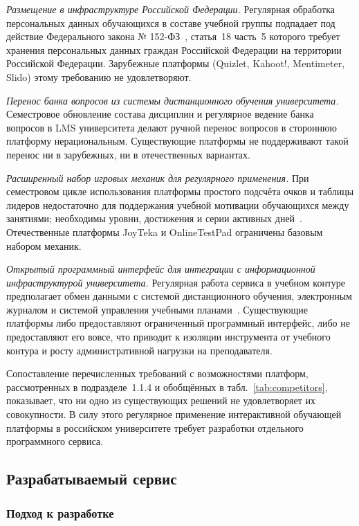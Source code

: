 \emph{Размещение в инфраструктуре Российской Федерации.} Регулярная
обработка персональных данных обучающихся в составе учебной группы
подпадает под действие Федерального закона
№ 152-ФЗ~\cite{fz152}, статья~18 часть~5 которого требует
хранения персональных данных граждан Российской Федерации
на территории Российской Федерации. Зарубежные платформы (Quizlet,
Kahoot!, Mentimeter, Slido) этому требованию не удовлетворяют.

\emph{Перенос банка вопросов из системы дистанционного обучения
университета.} Семестровое обновление состава дисциплин и регулярное
ведение банка вопросов в LMS университета делают ручной перенос
вопросов в стороннюю платформу нерациональным. Существующие
платформы не поддерживают такой перенос ни в зарубежных, ни
в отечественных вариантах.

\emph{Расширенный набор игровых механик для регулярного применения.}
При семестровом цикле использования платформы простого подсчёта
очков и таблицы лидеров недостаточно для поддержания учебной
мотивации обучающихся между занятиями; необходимы уровни,
достижения и серии активных дней~\cite{sailer2020,koivisto2019}.
Отечественные платформы JoyTeka и OnlineTestPad ограничены базовым
набором механик.

\emph{Открытый программный интерфейс для интеграции с
информационной инфраструктурой университета.} Регулярная работа
сервиса в учебном контуре предполагает обмен данными с системой
дистанционного обучения, электронным журналом и системой управления
учебными планами~\cite{rfc9110}. Существующие платформы либо
предоставляют ограниченный программный интерфейс, либо не
предоставляют его вовсе, что приводит к изоляции инструмента
от учебного контура и росту административной нагрузки на
преподавателя.

Сопоставление перечисленных требований с возможностями платформ,
рассмотренных в подразделе~1.1.4 и обобщённых в
табл.~\ref{tab:competitors}, показывает, что ни одно из существующих
решений не удовлетворяет их совокупности. В силу этого регулярное
применение интерактивной обучающей платформы в российском университете требует разработки отдельного программного
сервиса.

\subsection{Разрабатываемый сервис}

\subsubsection{Подход к разработке}

